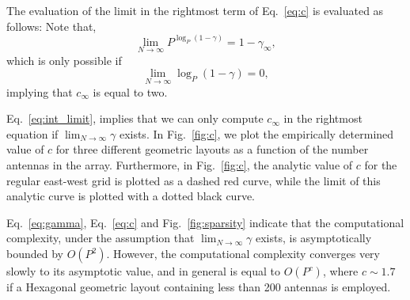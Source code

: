\documentclass[useAMS,usenatbib]{mn2e}
\begin{document}
The evaluation of the limit in the rightmost term of Eq.~\eqref{eq:c} is evaluated as follows: 
Note that,
\begin{equation}
\label{eq:int_limit}
\lim_{N\rightarrow\infty} P^{\log_{P}(1-\gamma)} = 1-\gamma_{\infty},
\end{equation}
which is only possible if 
\begin{equation}
\lim_{N\rightarrow\infty} \log_{P}(1-\gamma) = 0,
\end{equation}
implying that $c_{\infty}$ is equal to two.

Eq.~\eqref{eq:int_limit}, implies that we can only compute $c_{\infty}$ in the rightmost equation if $\lim_{N\rightarrow \infty} \gamma$ exists. 
In Fig.~\ref{fig:c}, we plot the empirically determined value of $c$ for three different geometric layouts as a function of the number antennas in the array.
Furthermore, in Fig.~\ref{fig:c}, the analytic value of $c$ for the regular east-west grid is plotted as a dashed red curve, while the limit of this analytic curve is plotted with a dotted black curve. 

Eq.~\eqref{eq:gamma}, Eq.~\eqref{eq:c} and Fig.~\ref{fig:sparsity} indicate that the computational complexity, under the assumption that $\lim_{N\rightarrow \infty} \gamma$ exists, is asymptotically bounded by $O(P^2)$.
However, the computational complexity converges very slowly to its asymptotic value, and in general is equal to $O(P^{c})$, where $c \sim 1.7$ if a Hexagonal geometric layout containing less than 200 antennas is employed.
\end{document}
